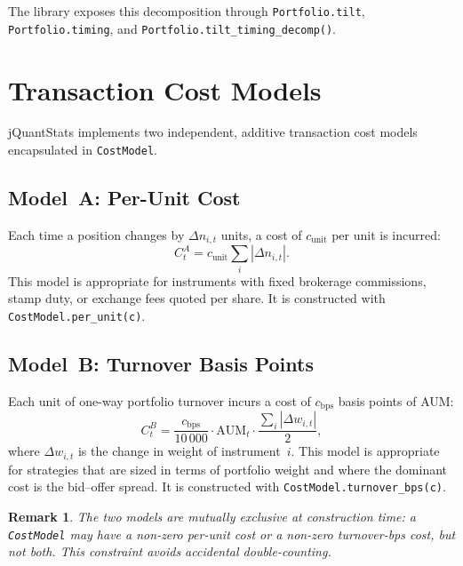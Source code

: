 \documentclass[11pt,a4paper]{article}
\newtheorem{remark}{Remark}
\begin{document}
The library exposes this decomposition through \texttt{Portfolio.tilt},
\texttt{Portfolio.timing}, and \texttt{Portfolio.tilt\_timing\_decomp()}.

\section{Transaction Cost Models}
\label{sec:costs}

jQuantStats implements two independent, additive transaction cost models
encapsulated in \texttt{CostModel}.

\subsection{Model~A: Per-Unit Cost}

Each time a position changes by $\Delta n_{i,t}$ units, a cost of
$c_{\text{unit}}$ per unit is incurred:
\begin{equation}
  C_t^A = c_{\text{unit}} \sum_i |\Delta n_{i,t}|.
\end{equation}
This model is appropriate for instruments with fixed brokerage commissions,
stamp duty, or exchange fees quoted per share.  It is constructed with
\texttt{CostModel.per\_unit(c)}.

\subsection{Model~B: Turnover Basis Points}

Each unit of one-way portfolio turnover incurs a cost of $c_{\text{bps}}$
basis points of AUM:
\begin{equation}
  C_t^B = \frac{c_{\text{bps}}}{10\,000} \cdot \mathrm{AUM}_t \cdot
          \frac{\sum_i |\Delta w_{i,t}|}{2},
\end{equation}
where $\Delta w_{i,t}$ is the change in weight of instrument~$i$.  This model
is appropriate for strategies that are sized in terms of portfolio weight and
where the dominant cost is the bid–offer spread.  It is constructed with
\texttt{CostModel.turnover\_bps(c)}.

\begin{remark}
The two models are mutually exclusive at construction time: a \texttt{CostModel}
may have a non-zero per-unit cost or a non-zero turnover-bps cost, but not both.
This constraint avoids accidental double-counting.
\end{remark}
\end{document}

